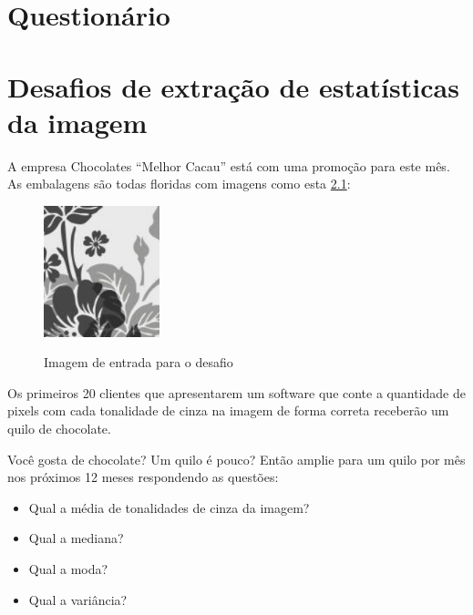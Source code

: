 \documentclass[
	12pt,				%
	oneside,			%
	a4paper,			%
	english,			%
	french,				%
	spanish,			%
	brazil,				%
	]{abntex2}
\begin{document}
\begin{apendicesenv}

\partapendices

\chapter{Questionário}
\label{apen:questionario}

\lipsum[55-57]

\chapter{Desafios de extração de estatísticas da imagem}
\label{desafio:estatistica}

A empresa Chocolates “Melhor Cacau” está com uma promoção para este mês. As embalagens são todas floridas com imagens como esta \ref{fig:desafioEstatistica}:

\begin{figure}[ht]
\centering
\caption{Imagem de entrada para o desafio}
\includegraphics[width=0.3\textwidth]{imagens/Desafio_estatisticas.png}
\label{fig:desafioEstatistica}
\sourceAuthor
\end{figure}

Os primeiros 20 clientes que apresentarem um software que conte a quantidade de pixels com cada tonalidade de cinza na imagem de forma correta receberão um quilo de chocolate.

Você gosta de chocolate? Um quilo é pouco? Então amplie para um quilo por mês nos próximos 12 meses respondendo as questões:

\begin{itemize}
  \item Qual a média de tonalidades de cinza da imagem?
  \item Qual a mediana?
  \item Qual a moda?
  \item Qual a variância?
\end{itemize}


\end{apendicesenv}
\end{document}
